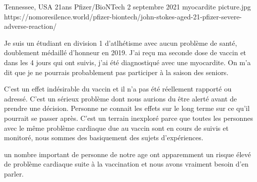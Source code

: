           {Tennessee, USA}
          {21ans}
          {Pfizer/BioNTech}
          {2 septembre 2021}
          {myocardite}
          {picture.jpg}
          {https://nomoresilence.world/pfizer-biontech/john-stokes-aged-21-pfizer-severe-adverse-reaction/}
          {
                
Je suis un étudiant en division 1 d'atlhétisme avec aucun problème de santé,
doublement médaillé d'honneur en 2019. J'ai reçu ma seconde dose de vaccin et
dans les 4 jours qui ont suivis, j'ai été diagnostiqué avec une myocardite. On
m'a dit que je ne pourrais probablement pas participer à la saison des seniors.

C'est un effet indésirable du vaccin et il n'a pas été réellement rapporté ou
adressé. C'est un sérieux problème dont nous aurions du être alerté avant de
prendre une décision. Personne ne connait les effets sur le long terme sur ce
qu'il pourrait se passer après. C'est un terrain inexploré parce que toutes les
personnes avec le même problème cardiaque due au vaccin sont en cours de suivis
et monitoré, nous sommes des basiquement des sujets d'expériences.

un nombre important de personne de notre age ont apparemment un risque élevé de
problème cardiaque suite à la vaccination et nous avons vraiment besoin d'en
parler.

}
